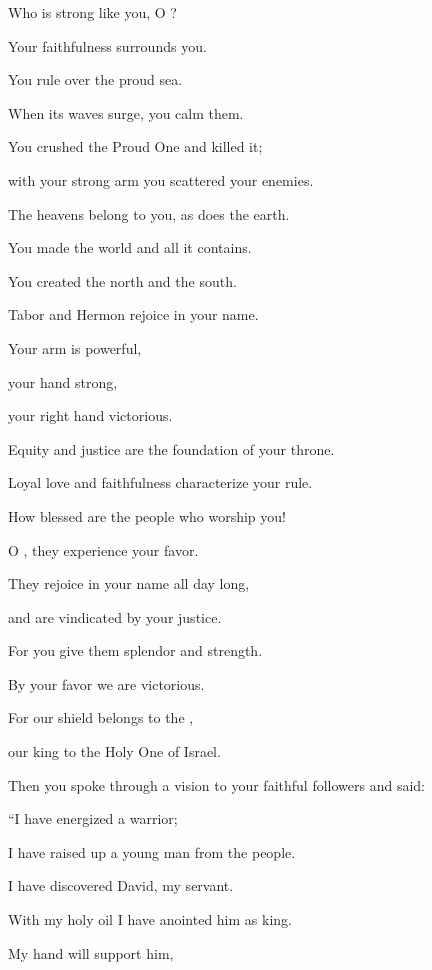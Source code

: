 {\par }{\Q Who
is strong
like
you, O
{}?
\par }{\Q Your faithfulness
surrounds you.
\par }{\Q {}You
rule
over the proud
sea.
\par }{\Q When its waves
surge,
you
calm them.
\par }{\Q {}You
crushed
the Proud One
and killed
it;

\par }{\Q with your strong
arm
you scattered
your enemies.
\par }{\Q {}The heavens
belong to you, as does
the earth.
\par }{\Q You
made
the world
and all it contains.
\par }{\Q {}You
created
the north
and the south.
\par }{\Q Tabor
and Hermon
rejoice
in your name.
\par }{\Q {}Your arm
is powerful,
\par }{\Q your hand
strong,
\par }{\Q your right hand
victorious.
\par }{\Q {}Equity
and justice
are the foundation
of your throne.
\par }{\Q Loyal love
and faithfulness
characterize your rule.
\par }{\Q {}How blessed
are the people
who worship
you!

\par }{\Q O
{}, they experience
your favor.
\par }{\Q {}They rejoice
in your name
all
day
long,
\par }{\Q and are vindicated
by your justice.
\par }{\Q {}For
you give them splendor
and strength.
\par }{\Q By your
favor
we are victorious.
\par }{\Q {}For
our shield
belongs to the
{},
\par }{\Q our king
to the Holy One
of Israel.
\par }{\Q {}Then
you spoke
through a vision
to your faithful followers
and said:
\par }{\Q “I have energized
a warrior;
\par }{\Q I have raised up
a young man
from the people.
\par }{\Q {}I have discovered
David,
my servant.
\par }{\Q With my holy
oil
I have anointed him as king.
\par }{\Q {}My hand
will support
him,

}
